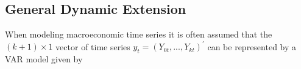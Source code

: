 \subsection{General Dynamic Extension}
When modeling macroeconomic time series it is often assumed that the $(k+1)\times 1$ vector of time series $y_t = (Y_{0t}, ..., Y_{kt})^\prime$ can be represented by a \ac{VAR} model given by 




